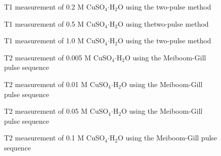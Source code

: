   \begin{figure}[h]
    \resizebox{0.75\textwidth}{!}{}
    \caption{T1 measurement of 0.2 M  CuSO$_{4} \boldsymbol{\cdot} $H$_2$O using the two-pulse method }
    \label{figAp:0d2_t1}
  \end{figure}

  \begin{figure}[h]
    \resizebox{0.75\textwidth}{!}{}
    \caption{T1 measurement of 0.5 M  CuSO$_{4} \boldsymbol{\cdot} $H$_2$O using thetwo-pulse method }
    \label{figAp:0d5_t1}
  \end{figure}

  \begin{figure}[h]
    \resizebox{0.75\textwidth}{!}{}
    \caption{T1 measurement of 1.0 M  CuSO$_{4} \boldsymbol{\cdot} $H$_2$O using the two-pulse method }
    \label{figAp:1d0_t1}
  \end{figure}



  \begin{figure}[h]
    \resizebox{0.75\textwidth}{!}{}
    \caption{T2 measurement of 0.005 M CuSO$_{4} \boldsymbol{\cdot} $H$_2$O using the Meiboom-Gill pulse sequence }
    \label{figAp:0d005_t2}
  \end{figure}

  \begin{figure}[h]
    \resizebox{0.75\textwidth}{!}{}
    \caption{T2 measurement of 0.01 M CuSO$_{4} \boldsymbol{\cdot} $H$_2$O using the Meiboom-Gill pulse sequence }
    \label{figAp:0d01_t2}
  \end{figure}

  \begin{figure}[h]
    \resizebox{0.75\textwidth}{!}{}
    \caption{T2 measurement of 0.05 M CuSO$_{4} \boldsymbol{\cdot} $H$_2$O using the Meiboom-Gill pulse sequence }
    \label{figAp:0d05_t2}
  \end{figure}

  \begin{figure}[h]
    \resizebox{0.75\textwidth}{!}{}
    \caption{T2 measurement of 0.1 M CuSO$_{4} \boldsymbol{\cdot} $H$_2$O using the Meiboom-Gill pulse sequence }
    \label{figAp:0d1_t2}
  \end{figure}


